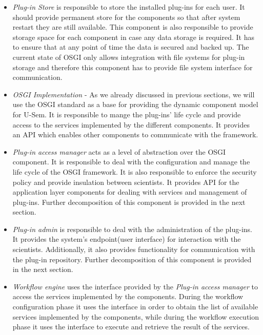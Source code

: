 \begin{itemize}

\item \textit{Plug-in Store} is responsible to store the installed plug-ins for each user. It should provide permanent store for the components so that after system restart they are still available. This component is also responsible to provide storage space for each component in case any data storage is required. It has to ensure that at any point of time the data is secured and backed up. The current state of OSGI only allows integration with file systems for plug-in storage and therefore this component has to provide file system interface for communication.

\item \textit{OSGI Implementation} - As we already discussed in previous sections, we will use the OSGI standard as a base for providing the dynamic component model for U-Sem. It is responsible to mange the plug-ins' life cycle and provide access to the services implemented by the different components. It provides an API which enables other components to communicate with the framework.

\item \textit{Plug-in access manager} acts as a level of abstraction over the OSGI component. It is responsible to deal with the configuration and manage the life cycle of the OSGI framework. It is also responsible to enforce the security policy and provide insulation between scientists. It provides API for the application layer components for dealing with services and management of plug-ins. Further decomposition of this component is provided in the next section.

\item \textit{Plug-in admin} is responsible to deal with the administration of the plug-ins. It provides the system's endpoint(user interface) for interaction with the scientists. Additionally, it also provides functionality for communication with the plug-in repository. Further decomposition of this component is provided in the next section. 

\item \textit{Workflow engine} uses the interface provided by the \textit{Plug-in access manager} to access the services implemented by the components. During the workflow configuration phase it uses the interface in order to obtain the list of available services implemented by the components, while during the workflow execution phase it uses the interface to execute and retrieve the result of the services.
	
\end{itemize}


